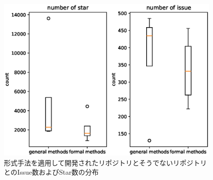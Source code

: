 \documentclass[main]{subfiles}
\begin{document}


\begin{figure}[p]
	\centering
	\includegraphics[width=\hsize]{figures/boxplot.eps}
	\caption{形式手法を適用して開発されたリポジトリとそうでないリポジトリとのIssue数およびStar数の分布}
	\label{fig:boxplot}
\end{figure}
\end{document}
